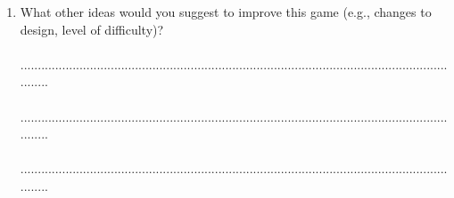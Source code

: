 \documentclass[12pt]{article}\pagestyle{myheadings}
\theoremstyle{plain}
\begin{document}
\begin{mdframed}
\begin{enumerate}
\item What other ideas would you suggest to improve this game (e.g., changes to design, level of difficulty)?\\
\\...................................................................................................................................\\
\\...................................................................................................................................\\
\\...................................................................................................................................\\
\end{enumerate}
\end{mdframed}
\end{document}
